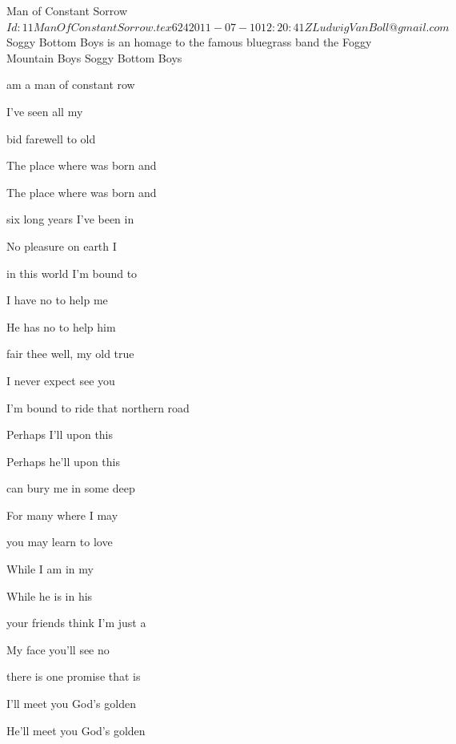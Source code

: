 \begin{SBSong}{Man of Constant Sorrow}
  {$Id: 11ManOfConstantSorrow.tex 624 2011-07-10 12:20:41Z LudwigVanBoll@gmail.com $}
  {Soggy Bottom Boys is an homage to the famous bluegrass band the Foggy Mountain Boys}
  {Soggy Bottom Boys}
  \begin{SBVerse}
     am a man of constant row
    
    I've seen  all my 
    
     bid farewell to old 
    
    The place where  was born and 
    
    The place where  was born and 
  \end{SBVerse}
  \begin{SBVerse}
     six long years I've been in 
    
    No pleasure  on earth I 
    
     in this world I'm bound to 
    
    I have no  to help me 
    
    He has no  to help him 
  \end{SBVerse}
  \begin{SBVerse}
     fair thee well, my old true 
    
    I never expect  see you 
  
     I'm bound to ride that northern road
    
    Perhaps I'll  upon this 
    
    Perhaps he'll  upon this 
  \end{SBVerse}
  \begin{SBVerse}
     can bury me in some deep 
    
    For many  where I may 

     you may learn to love 
    
    While I am  in my 

    While he is  in his 
  \end{SBVerse}
  \begin{SBVerse}
     your friends think I'm just a 
    
    My face you'll  see no 
    
     there is one promise that is 
    
    I'll meet you  God's golden 
    
    He'll meet you  God's golden 
  \end{SBVerse}
\end{SBSong}
